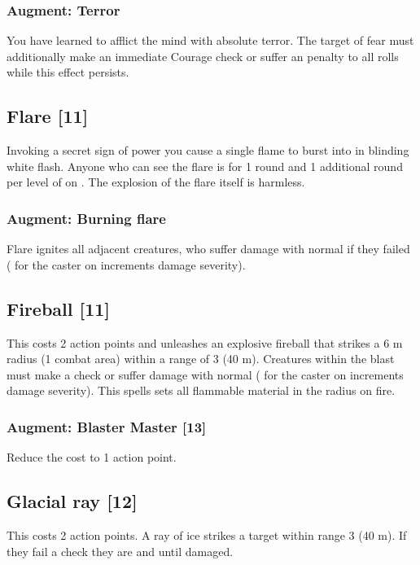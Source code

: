 \subsubsection{Augment: Terror}
You have learned to afflict the mind with absolute terror. The target of fear must additionally make an immediate Courage check or suffer an  penalty to all rolls while this effect persists. 


\subsection{Flare [11]}
\label{spell:flare}
Invoking a secret sign of power you cause a single flame to burst into in blinding white flash. Anyone who can see the flare is  for 1 round and 1 additional round per level of  on . The explosion of the flare itself is harmless.
\subsubsection{Augment: Burning flare}
Flare ignites all adjacent creatures, who suffer damage with normal  if they failed  ( for the caster on  increments damage severity).


\subsection{Fireball [11]}
This costs 2 action points and unleashes an explosive fireball that strikes a 6 m radius (1 combat area) within a range of 3 (40 m). Creatures within the blast must make a  check or suffer damage with normal  ( for the caster on  increments damage severity). This spells sets all flammable material in the radius on fire.
\subsubsection{Augment: Blaster Master [13]}
Reduce the cost to 1 action point.


\subsection{Glacial ray [12]}
This costs 2 action points. A ray of ice strikes a target within range 3 (40 m). If they fail a  check they are  and  until damaged. 
